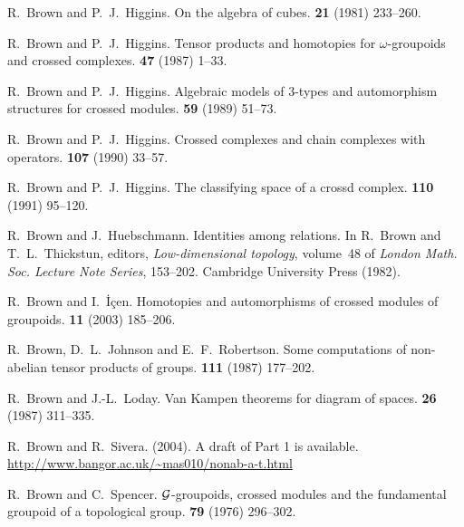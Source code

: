 \begin{thebibliography}{notesdev}
R.~Brown and P.~J.~Higgins.
\newblock On the algebra of cubes.
 {\bf 21} (1981) 233--260.

R.~Brown and P.~J.~Higgins.
\newblock Tensor products and homotopies for $\omega$-groupoids and crossed
  complexes.
 {\bf 47} (1987) 1--33.

R.~Brown and P.~J.~Higgins.
\newblock Algebraic models of $3$-types and automorphism structures for crossed
  modules.
 {\bf 59} (1989) 51--73.

R.~Brown and P.~J.~Higgins.
\newblock Crossed complexes and chain complexes with operators.
 {\bf 107} (1990) 33--57.

R.~Brown and P.~J.~Higgins.
\newblock The classifying space of a crossd complex.
 {\bf 110} (1991) 95--120.

R.~Brown and J.~Huebschmann.
\newblock Identities among relations.
\newblock In R.~Brown and T.~L.~Thickstun, editors, {\em Low-dimensional
  topology\/}, volume~48 of {\em London Math. Soc. Lecture Note Series\/},
  153--202. Cambridge University Press (1982).

R.~Brown and I.~\.{I}\c{c}en.
\newblock Homotopies and automorphisms of crossed modules of groupoids.
 {\bf 11} (2003) 185--206.

R.~Brown, D.~L.~Johnson and E.~F.~Robertson.
\newblock Some computations of non-abelian tensor products of groups.
 {\bf 111} (1987) 177--202.

R.~Brown and J.-L.~Loday.
\newblock Van Kampen theorems for diagram of spaces.
 {\bf 26} (1987) 311--335.

R.~Brown and R.~Sivera.
 (2004).
\newblock A draft of Part 1 is available.
\newline\urlprefix\url{http://www.bangor.ac.uk/~mas010/nonab-a-t.html}

R.~Brown and C.~Spencer.
\newblock $\mathcal{G}$-groupoids, crossed modules and the fundamental groupoid of a
  topological group.
 {\bf 79} (1976) 296--302.


\end{thebibliography}
